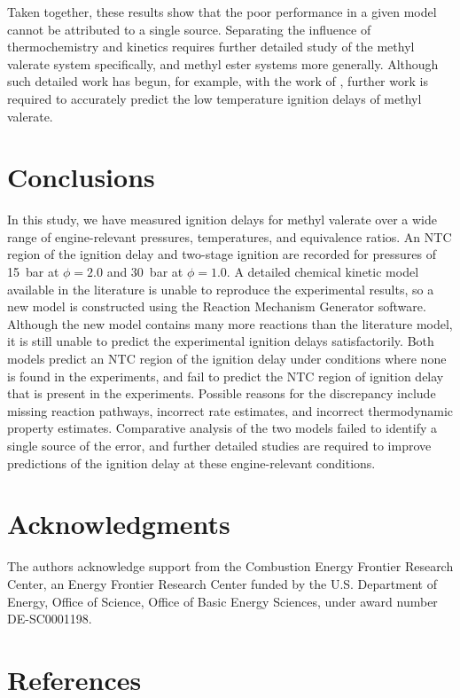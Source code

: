 \documentclass[letterpaper, review, sort&compress]{elsarticle}
\begin{document}
Taken together, these results show that the poor performance in a given model cannot be attributed
to a single source. Separating the influence of thermochemistry and kinetics requires further
detailed study of the methyl valerate system specifically, and methyl ester systems more generally.
Although such detailed work has begun, for example, with the work of \citet{Hayes2009}, further work
is required to accurately predict the low temperature ignition delays of methyl valerate.

\section{Conclusions}\label{sec:conclusions}

In this study, we have measured ignition delays for methyl valerate over a wide range of
engine-relevant pressures, temperatures, and equivalence ratios. An NTC region of the ignition delay
and two-stage ignition are recorded for pressures of \SI{15}{\bar} at \(\phi=2.0\) and \SI{30}{\bar}
at \(\phi=1.0\). A detailed chemical kinetic model available in the literature is unable to
reproduce the experimental results, so a new model is constructed using the Reaction Mechanism
Generator software. Although the new model contains many more reactions than the literature model,
it is still unable to predict the experimental ignition delays satisfactorily. Both models predict
an NTC region of the ignition delay under conditions where none is found in the experiments, and
fail to predict the NTC region of ignition delay that is present in the experiments. Possible
reasons for the discrepancy include missing reaction pathways, incorrect rate estimates, and
incorrect thermodynamic property estimates. Comparative analysis of the two models failed to
identify a single source of the error, and further detailed studies are required to improve
predictions of the ignition delay at these engine-relevant conditions.

\section{Acknowledgments}\label{sec:acknowledgments}

The authors acknowledge support from the Combustion Energy Frontier Research Center, an Energy
Frontier Research Center funded by the U.S. Department of Energy, Office of Science, Office of Basic
Energy Sciences, under award number DE-SC0001198.

\section*{References}

\end{document}
